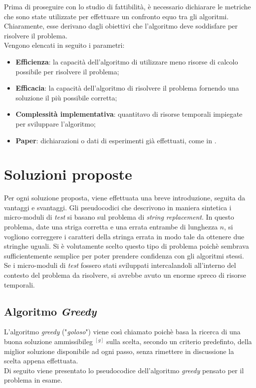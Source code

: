 \noindent Prima di proseguire con lo studio di fattibilità, è necessario dichiarare le metriche che sono state
utilizzate per effettuare un confronto equo tra gli algoritmi. Chiaramente, esse derivano dagli obiettivi che
l'algoritmo deve soddisfare per risolvere il problema.\\
Vengono elencati in seguito i parametri:
\begin{itemize}
    \item \textbf{Efficienza}: la capacità dell'algoritmo di utilizzare meno risorse di calcolo possibile per risolvere il problema;
    \item \textbf{Efficacia}: la capacità dell'algoritmo di risolvere il problema fornendo una soluzione il più possibile corretta;
    \item \textbf{Complessità implementativa}: quantitavo di risorse temporali impiegate per sviluppare l'algoritmo;
    \item \textbf{Paper}: dichiarazioni o dati di esperimenti già effettuati, come in \cite{siteA:paper-chen} \cite{siteR:paper-roli} \cite{siteU:paper-carlos}.
\end{itemize}


\section{Soluzioni proposte}
\noindent Per ogni soluzione proposta, viene effettuata una breve introduzione, seguita da vantaggi e svantaggi.
Gli pseudocodici che descrivono in maniera sintetica i micro-moduli di \textit{test} si basano sul problema di \textit{string replacement}.
In questo problema, date una striga corretta e una errata entrambe di lunghezza $n$, si vogliono correggere i caratteri della stringa errata
in modo tale da ottenere due stringhe uguali.
Si è volutamente scelto questo tipo di problema poichè sembrava sufficientemente semplice per poter prendere confidenza con gli algoritmi stessi.
Se i micro-moduli di \textit{test} fossero stati sviluppati intercalandoli all'interno del contesto del problema da risolvere, si avrebbe avuto un
enorme spreco di risorse temporali.

\subsection{Algoritmo \textit{Greedy}}
\noindent L'algoritmo \textit{greedy} ("\textit{goloso}") \cite{Cormen:algoritmi} viene così chiamato poichè basa la ricerca di una buona
soluzione \gls{ammissibileg} $^{[g]}$ sulla scelta, secondo un criterio predefinto, della miglior soluzione disponibile ad ogni passo, senza
rimettere in discussione la scelta appena effettuata.\\
Di seguito viene presentato lo pseudocodice dell'algoritmo \textit{greedy} pensato per il problema in esame.

